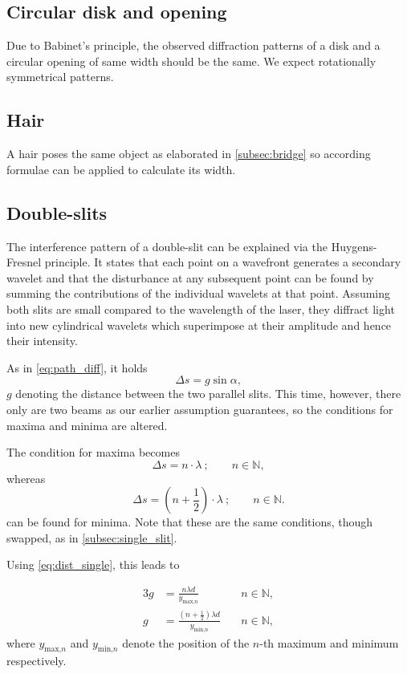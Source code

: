 \subsection{Circular disk and opening}
Due to Babinet's principle, the observed diffraction patterns of a disk and a circular opening of same width should be the same.
We expect rotationally symmetrical patterns.

\subsection{Hair}
A hair poses the same object as elaborated in \autoref{subsec:bridge} so according formulae can be applied to calculate its width.

\subsection{Double-slits}
The interference pattern of a double-slit can be explained via the Huygens-Fresnel principle.
It states that each point on a wavefront generates a secondary wavelet and that the disturbance at any subsequent point can be found by summing the contributions of the individual wavelets at that point.
Assuming both slits are small compared to the wavelength of the laser, they diffract light into new cylindrical wavelets which superimpose at their amplitude and hence their intensity.

As in \autoref{eq:path_diff}, it holds
\begin{equation*}
	\Delta s=g\sin\alpha,
\end{equation*}
$g$ denoting the distance between the two parallel slits.
This time, however, there only are two beams as our earlier assumption guarantees, so the conditions for maxima and minima are altered.

The condition for maxima becomes
\begin{equation}\label{eq:double_path_max}
	\Delta s = n\cdot\lambda\ ;\qquad n\in\mathbb{N},
\end{equation}
whereas
\begin{equation}\label{eq:double_path_min}
	\Delta s = \left(n+\frac{1}{2}\right)\cdot\lambda\ ;\qquad n\in\mathbb{N}.
\end{equation}
can be found for minima.
Note that these are the same conditions, though swapped, as in \autoref{subsec:single_slit}.

Using \autoref{eq:dist_single}, this leads to

\begin{alignat}{3}
 	g &= \frac{n\lambda d}{y_{\text{max,}n}} &\quad n\in\mathbb{N},\label{eq:double_max} \\
	g &= \frac{\left(n+\frac{1}{2}\right)\lambda d}{y_{\text{min,}n}} &\quad n\in\mathbb{N}, \label{eq:double_min}
\end{alignat}
where $y_{\text{max,}n}$ and $y_{\text{min,}n}$ denote the position of the $n$-th maximum and minimum respectively.


